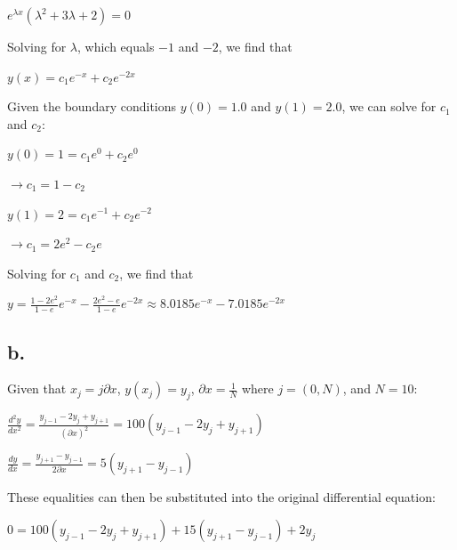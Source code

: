 \documentclass{report}
\begin{document}
	$e^{\lambda x} \left( \lambda^2 + 3 \lambda + 2 \right) = 0$
	
	\textit{}
	
	\noindent Solving for $\lambda$, which equals $-1$ and $-2$, we find that
	
	\textit{}
	
	$y(x) = c_1 e^{-x} + c_2 e^{-2x}$
	
	\textit{}
	
	\noindent Given the boundary conditions $y(0) = 1.0$ and $y(1) = 2.0$, we can solve for $c_1$ and $c_2$:
	
	\textit{}
	
	$y(0) = 1 = c_1 e^0 + c_2 e^0$
	
	$\rightarrow c_1 = 1 - c_2$
	
	\textit{}
	
	$y(1) = 2 = c_1 e^{-1} + c_2 e^{-2}$
	
	$\rightarrow c_1 = 2e^2 - c_2 e$
	
	\textit{}
	
	\noindent Solving for $c_1$ and $c_2$, we find that
	
	\textit{}
	
	$y = \frac{1 - 2e^2}{1 - e} e^{-x} - \frac{2e^2 - e}{1 - e} e^{-2x} \approx 8.0185e^{-x} - 7.0185e^{-2x}$
	
	\textit{}
	
	\newpage
	
	\subsection*{b.}
	
	Given that $x_j = j \partial x$, $y(x_j) = y_j$, $\partial x = \frac{1}{N}$ where $j = (0, N)$, and $N = 10$:
	
	\textit{}
	
	$\frac{d^2 y}{dx^2} = \frac{y_{j - 1} - 2y_j + y_{j + 1}}{(\partial x)^2} = 100 \left( y_{j - 1} -2y_j + y_{j + 1} \right)$
	
	\textit{}
	
	$\frac{dy}{dx} = \frac{y_{j + 1} - y_{j - 1}}{2 \partial x} = 5 \left( y_{j + 1} - y_{j - 1} \right)$
	
	\textit{}
	
	\noindent These equalities can then be substituted into the original differential equation:
	
	\textit{}
	
	$0 = 100 \left( y_{j - 1} -2y_j + y_{j + 1} \right) + 15 \left( y_{j + 1} - y_{j - 1} \right) + 2y_j$
	
\end{document}
